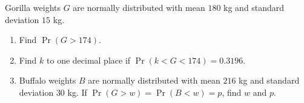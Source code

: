 Gorilla weights $G$ are normally distributed with mean $180$ kg and standard deviation $15$ kg.
\begin{enumerate}\item Find $\Pr(G>174)$.
\item Find $k$ to one decimal place if $\Pr(k<G<174)=0.3196$.
\item Buffalo weights $B$ are normally distributed with mean $216$ kg and standard deviation $30$ kg. If $\Pr(G>w)=\Pr(B<w)=p$, find $w$ and $p$.\end{enumerate}
